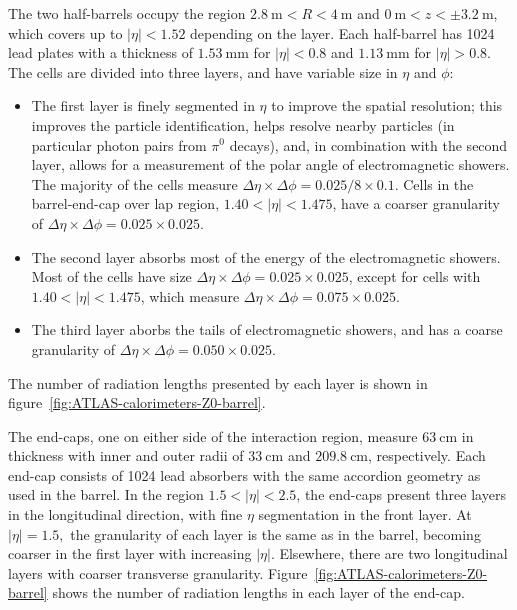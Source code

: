 The two half-barrels occupy the region $\SI{2.8}{\meter}<R<\SI{4}{\meter}$ and $\SI{0}{\meter}<z<\pm\SI{3.2}{\meter}$, which covers up to $|\eta|<1.52$ depending on the layer. Each half-barrel has 1024 lead plates with a thickness of $\SI{1.53}{\milli\meter}$ for $|\eta|<0.8$ and $\SI{1.13}{\milli\meter}$ for $|\eta|>0.8$. The cells are divided into three layers, and have variable size in $\eta$ and $\phi$:

\begin{itemize}
	\item The first layer is finely segmented in $\eta$ to improve the spatial resolution; this improves the particle identification, helps resolve nearby particles (in particular photon pairs from $\pi^0$ decays), and, in combination with the second layer, allows for a measurement of the polar angle of electromagnetic showers. The majority of the cells measure $\Delta\eta\times\Delta\phi=0.025/8\times0.1$. Cells in the barrel-end-cap over lap region, $1.40<|\eta|<1.475$, have a coarser granularity of $\Delta\eta\times\Delta\phi=0.025\times0.025$.

	\item The second layer absorbs most of the energy of the electromagnetic showers. Most of the cells have size $\Delta\eta\times\Delta\phi=0.025\times0.025$, except for cells with $1.40<|\eta|<1.475$, which measure $\Delta\eta\times\Delta\phi=0.075\times0.025$.

	\item The third layer aborbs the tails of electromagnetic showers, and has a coarse granularity of $\Delta\eta\times\Delta\phi=0.050\times0.025$.
\end{itemize}



The number of radiation lengths presented by each layer is shown in figure~\ref{fig:ATLAS-calorimeters-Z0-barrel}. 

The end-caps, one on either side of the interaction region, measure $\SI{63}{\centi\meter}$ in thickness with inner and outer radii of $\SI{33}{\centi\meter}$ and $\SI{209.8}{\centi\meter}$, respectively. 
Each end-cap consists of 1024 lead absorbers with the same accordion geometry as used in the barrel. In the region $1.5<|\eta|<2.5$, the end-caps present three layers in the longitudinal direction, with fine $\eta$ segmentation in the front layer. At $|\eta|=1.5,$ the granularity of each layer is the same as in the barrel, becoming coarser in the first layer with increasing $|\eta|$. Elsewhere, there are two longitudinal layers with coarser transverse granularity. Figure~\ref{fig:ATLAS-calorimeters-Z0-barrel} shows the number of radiation lengths in each layer of the end-cap.

